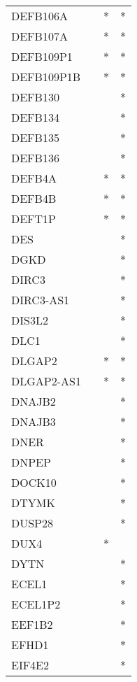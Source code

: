 \begin{longtable}{lccc}
DEFB106A       &       &  * &       * \\
DEFB107A       &       &  * &       * \\
DEFB109P1      &       &  * &       * \\
DEFB109P1B     &       &  * &       * \\
DEFB130        &       &    &       * \\
DEFB134        &       &    &       * \\
DEFB135        &       &    &       * \\
DEFB136        &       &    &       * \\
DEFB4A         &       &  * &       * \\
DEFB4B         &       &  * &       * \\
DEFT1P         &       &  * &       * \\
DES            &       &    &       * \\
DGKD           &       &    &       * \\
DIRC3          &       &    &       * \\
DIRC3-AS1      &       &    &       * \\
DIS3L2         &       &    &       * \\
DLC1           &       &    &       * \\
DLGAP2         &       &  * &       * \\
DLGAP2-AS1     &       &  * &       * \\
DNAJB2         &       &    &       * \\
DNAJB3         &       &    &       * \\
DNER           &       &    &       * \\
DNPEP          &       &    &       * \\
DOCK10         &       &    &       * \\
DTYMK          &       &    &       * \\
DUSP28         &       &    &       * \\
DUX4           &       &  * &         \\
DYTN           &       &    &       * \\
ECEL1          &       &    &       * \\
ECEL1P2        &       &    &       * \\
EEF1B2         &       &    &       * \\
EFHD1          &       &    &       * \\
EIF4E2         &       &    &       * \\

\end{longtable}
